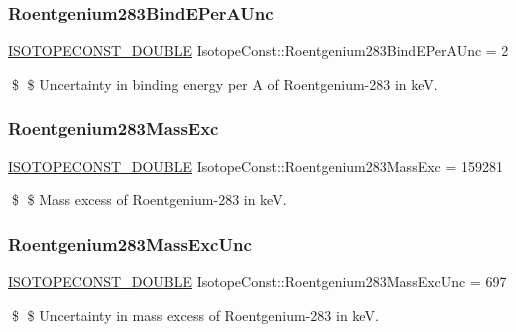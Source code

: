 \subsubsection{\texorpdfstring{Roentgenium283\+Bind\+E\+Per\+A\+Unc}{Roentgenium283BindEPerAUnc}}
{\footnotesize\ttfamily \mbox{\hyperlink{group___isotope_const-_macros_ga8f45a7272ce02c0b4c65c44636ed719a}{I\+S\+O\+T\+O\+P\+E\+C\+O\+N\+S\+T\+\_\+\+D\+O\+U\+B\+LE}} Isotope\+Const\+::\+Roentgenium283\+Bind\+E\+Per\+A\+Unc = 2}

\$ \$ Uncertainty in binding energy per A of Roentgenium-\/283 in keV. \mbox{\label{group___isotope_const-_roentgenium-_rg283_ga9b792efa995b11d176326eb2db44d829}} 
\subsubsection{\texorpdfstring{Roentgenium283\+Mass\+Exc}{Roentgenium283MassExc}}
{\footnotesize\ttfamily \mbox{\hyperlink{group___isotope_const-_macros_ga8f45a7272ce02c0b4c65c44636ed719a}{I\+S\+O\+T\+O\+P\+E\+C\+O\+N\+S\+T\+\_\+\+D\+O\+U\+B\+LE}} Isotope\+Const\+::\+Roentgenium283\+Mass\+Exc = 159281}

\$ \$ Mass excess of Roentgenium-\/283 in keV. \mbox{\label{group___isotope_const-_roentgenium-_rg283_ga96d64c518fdb1e0f24c8304153801b9e}} 
\subsubsection{\texorpdfstring{Roentgenium283\+Mass\+Exc\+Unc}{Roentgenium283MassExcUnc}}
{\footnotesize\ttfamily \mbox{\hyperlink{group___isotope_const-_macros_ga8f45a7272ce02c0b4c65c44636ed719a}{I\+S\+O\+T\+O\+P\+E\+C\+O\+N\+S\+T\+\_\+\+D\+O\+U\+B\+LE}} Isotope\+Const\+::\+Roentgenium283\+Mass\+Exc\+Unc = 697}

\$ \$ Uncertainty in mass excess of Roentgenium-\/283 in keV. \mbox{\label{group___isotope_const-_roentgenium-_rg283_ga5b8d906d6144f9693c26bb3ee7f5493c}} 
